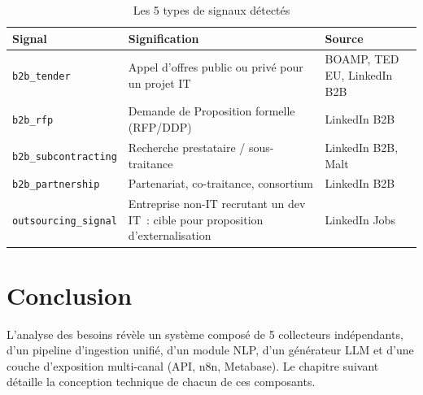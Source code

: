 \begin{table}[H]
  \centering
  \begin{tabular}{L{3.2cm} L{5.5cm} L{3.8cm}}
    \toprule
    \textbf{Signal} & \textbf{Signification} & \textbf{Source} \\
    \midrule
    \texttt{b2b\_tender} & Appel d'offres public ou privé pour un projet IT
      & BOAMP, TED EU, LinkedIn B2B \\
    \addlinespace
    \texttt{b2b\_rfp} & Demande de Proposition formelle (RFP/DDP)
      & LinkedIn B2B \\
    \addlinespace
    \texttt{b2b\_subcontracting} & Recherche prestataire / sous-traitance
      & LinkedIn B2B, Malt \\
    \addlinespace
    \texttt{b2b\_partnership} & Partenariat, co-traitance, consortium
      & LinkedIn B2B \\
    \addlinespace
    \texttt{outsourcing\_signal} & Entreprise non-IT recrutant un dev IT~: cible
      pour proposition d'externalisation
      & LinkedIn Jobs \\
    \bottomrule
  \end{tabular}
  \caption{Les 5 types de signaux détectés}
  \label{tab:signal_types}
\end{table}

\section{Conclusion}

L'analyse des besoins révèle un système composé de 5 collecteurs indépendants,
d'un pipeline d'ingestion unifié, d'un module NLP, d'un générateur LLM et d'une
couche d'exposition multi-canal (API, n8n, Metabase). Le chapitre suivant
détaille la conception technique de chacun de ces composants.
